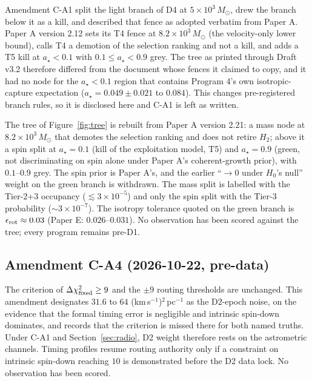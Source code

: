 \documentclass[11pt]{article}
\newcommand{\msun}{\ensuremath{M_\odot}}
\newcommand{\astar}{\ensuremath{a_\star}}
\begin{document}
Amendment C-A1 split the light branch of D4 at $5\times10^{3}\,\msun$, drew the branch below it as a kill, and described that fence as adopted verbatim from Paper A. Paper A version 2.12 sets its T4 fence at $8.2\times10^{3}\,\msun$ (the \citealt{Haberle2024Nature} velocity-only lower bound), calls T4 a demotion of the selection ranking and not a kill, and adds a T5 kill at $\astar < 0.1$ with $0.1 \leq \astar < 0.9$ grey. The tree as printed through Draft v3.2 therefore differed from the document whose fences it claimed to copy, and it had no node for the $\astar < 0.1$ region that contains Program 4's own isotropic-capture expectation ($\astar = 0.049\pm0.021$ to $0.084$). This changes pre-registered branch rules, so it is disclosed here and C-A1 is left as written.

The tree of Figure~\ref{fig:tree} is rebuilt from Paper A version 2.21: a mass node at $8.2\times10^{3}\,\msun$ that demotes the selection ranking and does not retire $H_2$; above it a spin split at $\astar = 0.1$ (kill of the exploitation model, T5) and $\astar = 0.9$ (green, not discriminating on spin alone under Paper A's coherent-growth prior), with $0.1$--$0.9$ grey. The spin prior is Paper A's, and the earlier ``$\to 0$ under $H_0$'s null'' weight on the green branch is withdrawn. The mass split is labelled with the Tier-2+3 occupancy ($\lesssim 3\times10^{-5}$) and only the spin split with the Tier-3 probability ($\sim 3\times10^{-7}$). The isotropy tolerance quoted on the green branch is $\epsilon_{\rm rot} \approx 0.03$ (Paper E: $0.026$--$0.031$). No observation has been scored against the tree; every program remains pre-D1.

\subsection{Amendment C-A4 (2026-10-22, pre-data)}
\label{sec:amendmentca4}

The criterion of $\Delta\chi^{2}_{\rm fixed} \geq 9$ and the $\pm9$ routing thresholds are unchanged. This amendment designates $31.6$ to $64$ (km\,s$^{-1}$)$^{2}$\,pc$^{-1}$ as the D2-epoch noise, on the evidence that the formal timing error is negligible and intrinsic spin-down dominates, and records that the criterion is missed there for both named truths. Under C-A1 and Section~\ref{sec:radio}, D2 weight therefore rests on the astrometric channels. Timing profiles resume routing authority only if a constraint on intrinsic spin-down reaching $10$ is demonstrated before the D2 data lock. No observation has been scored.
\end{document}
